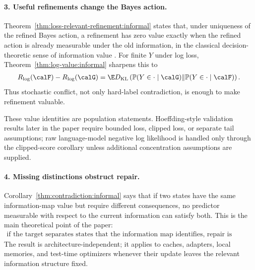 \paragraph{3. Useful refinements change the Bayes action.}
Theorem~\ref{thm:loss-relevant-refinement:informal} states that, under uniqueness of the refined Bayes action, a refinement has zero value exactly when the refined action is already measurable under the old information, in the classical decision-theoretic sense of information value \citep{blackwell1953equivalent,berger1985statistical}. For finite $Y$ under log loss, Theorem~\ref{thm:log-value:informal} sharpens this to
\begin{align*}
R_{\log}(\calF)-R_{\log}(\calG)
=
\E D_{\mathrm{KL}}\left(
\mathbb P(Y\in\cdot\mid\calG)
\middle\|
\mathbb P(Y\in\cdot\mid\calF)
\right).
\end{align*}
Thus stochastic conflict, not only hard-label contradiction, is enough to make refinement valuable.

These value identities are population statements. Hoeffding-style validation results later in the paper require bounded loss, clipped loss, or separate tail assumptions; raw language-model negative log likelihood is handled only through the clipped-score corollary unless additional concentration assumptions are supplied.

\paragraph{4. Missing distinctions obstruct repair.}
Corollary~\ref{thm:contradiction:informal} says that if two states have the same information-map value but require different consequences, no predictor measurable with respect to the current information can satisfy both. This is the main theoretical point of the paper:
\begin{align*}
\boxed{\text{if the target separates states that the information map identifies, repair is impossible.}}
\end{align*}
The result is architecture-independent; it applies to caches, adapters, local memories, and test-time optimizers whenever their update leaves the relevant information structure fixed.

